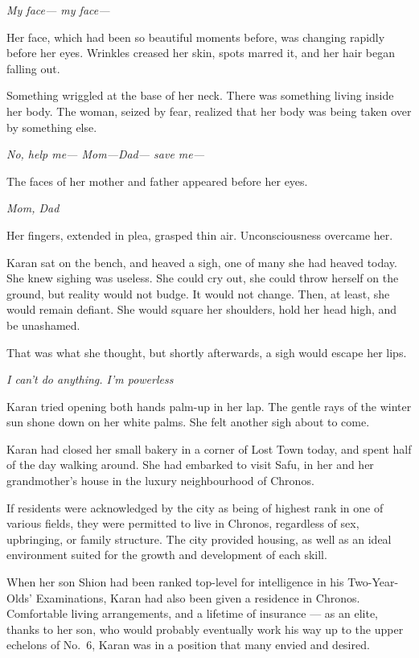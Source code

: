 \emph{My face--- my face---}

Her face, which had been so beautiful moments before, was changing
rapidly before her eyes. Wrinkles creased her skin, spots marred it, and
her hair began falling out.

Something wriggled at the base of her neck. There was something living
inside her body. The woman, seized by fear, realized that her body was
being taken over by something else.

\emph{No, help me--- Mom---Dad--- save me---}

The faces of her mother and father appeared before her eyes.

\emph{Mom, Dad\el }

Her fingers, extended in plea, grasped thin air. Unconsciousness
overcame her.

\mybreak

Karan sat on the bench, and heaved a sigh, one of many she had heaved
today. She knew sighing was useless. She could cry out, she could throw
herself on the ground, but reality would not budge. It would not change.
Then, at least, she would remain defiant. She would square her
shoulders, hold her head high, and be unashamed.

That was what she thought, but shortly afterwards, a sigh would escape
her lips.

\emph{I can't do anything. I'm powerless\el }

Karan tried opening both hands palm-up in her lap. The gentle rays of
the winter sun shone down on her white palms. She felt another sigh
about to come.

Karan had closed her small bakery in a corner of Lost Town today, and
spent half of the day walking around. She had embarked to visit Safu, in
her and her grandmother's house in the luxury neighbourhood of Chronos.

If residents were acknowledged by the city as being of highest rank in
one of various fields, they were permitted to live in Chronos,
regardless of sex, upbringing, or family structure. The city provided
housing, as well as an ideal environment suited for the growth and
development of each skill.

When her son Shion had been ranked top-level for intelligence in his
Two-Year-Olds' Examinations, Karan had also been given a residence in
Chronos. Comfortable living arrangements, and a lifetime of insurance ---
as an elite, thanks to her son, who would probably eventually work his
way up to the upper echelons of No.~6, Karan was in a position that many
envied and desired.

